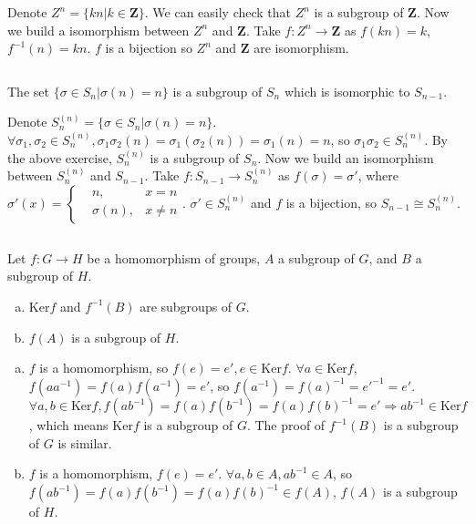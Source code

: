 \begin{answer}
    Denote $Z^{n}=\{kn|k\in\mathbf{Z}\}$. We can easily check that $Z^n$ is a subgroup of $\mathbf{Z}$. Now we build a isomorphism between $Z^{n}$ and $\mathbf{Z}$. Take $f:Z^{n}\to\mathbf{Z}$ as $f(kn)=k$, $f^{-1}(n)=kn$. $f$ is a bijection so $Z^{n}$ and $\mathbf{Z}$ are isomorphism.
\end{answer}

$$ $$

\begin{ex}
    The set $\{\sigma\in S_n | \sigma(n) = n\}$ is a subgroup of $S_n$ which is isomorphic to $S_{n-1}$.
\end{ex}

\begin{answer}
    Denote $S_n^{(n)}=\{\sigma\in S_n|\sigma(n)=n\}$. $\forall \sigma_1,\sigma_{2}\in S_n^{(n)}, \sigma_{1}\sigma_{2}(n)=\sigma_1(\sigma_{2}(n))=\sigma_{1}(n)=n$, so $\sigma_{1}\sigma_{2}\in S_n^{(n)}$. By the above exercise, $S_n^{(n)}$ is a subgroup of $S_n$. Now we build an isomorphism between $S_n^{(n)}$ and $S_{n-1}$.
    Take $f: S_{n-1}\to S_n^{(n)}$ as $f(\sigma) =\sigma'$, where $\sigma'(x)=\left\{\begin{aligned}
        &n, &x=n\\ &\sigma(n), &x\neq n
    \end{aligned}\right.$. $\sigma'\in S_n^{(n)}$ and $f$ is a bijection, so $S_{n-1}\cong S_n^{(n)}$.
\end{answer}

$$ $$

\begin{ex}
    Let $f: G\to H$ be a homomorphism of groups, $A$ a subgroup of $G$, and $B$ a subgroup of $H$.
    \begin{enumerate}[(a)]
        \item $\mathrm{Ker} f$ and $f^{-1}(B)$ are subgroups of $G$.
        \item $f(A)$ is a subgroup of $H$.
    \end{enumerate}
\end{ex}

\begin{answer}
    \begin{enumerate}[(a)]
        \item $f$ is a homomorphism, so $f(e)=e', e\in \mathrm{Ker} f$. $\forall a \in 
    \mathrm{Ker} f$, $f(aa^{-1})=f(a)f(a^{-1})=e'$, so $f(a^{-1})=f(a)^{-1}=e'^{-1}=e'$. $\forall a,b \in \mathrm{Ker} f, f(ab^{-1})=f(a)f(b^{-1})=f(a)f(b)^{-1}=e'\Rightarrow ab^{-1}\in \mathrm{Ker} f$, which means $\mathrm{Ker} f$ is a subgroup of $G$. The proof of $f^{-1}(B)$ is a subgroup of $G$ is similar.
        \item $f$ is a homomorphism, $f(e)=e'$. $\forall a,b\in A, ab^{-1}\in A$, so $f(ab^{-1})=f(a)f(b^{-1})=f(a)f(b)^{-1}\in f(A)$, $f(A)$ is a subgroup of $H$.
    \end{enumerate}
\end{answer}

